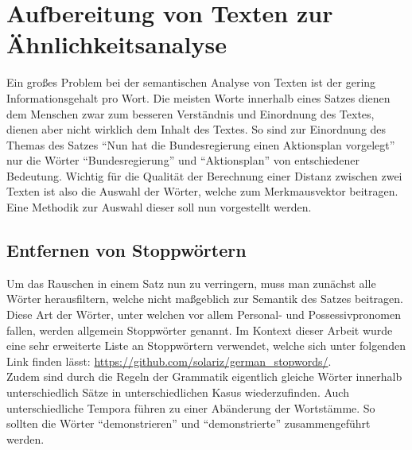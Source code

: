 \section{Aufbereitung von Texten zur Ähnlichkeitsanalyse}
\label{sec:aufbereitung_text}
Ein großes Problem bei der semantischen Analyse von Texten ist der gering Informationsgehalt pro Wort. Die meisten Worte innerhalb eines Satzes dienen dem Menschen zwar zum besseren Verständnis und Einordnung des Textes, dienen aber nicht wirklich dem Inhalt des Textes. So sind zur Einordnung des Themas des Satzes "`Nun hat die Bundesregierung einen Aktionsplan vorgelegt"' nur die Wörter "`Bundesregierung"' und "`Aktionsplan"' von entschiedener Bedeutung. Wichtig für die Qualität der Berechnung einer Distanz zwischen zwei Texten ist also die Auswahl der Wörter, welche zum Merkmausvektor beitragen. Eine Methodik zur Auswahl dieser soll nun vorgestellt werden.
\subsection{Entfernen von Stoppwörtern}
Um das Rauschen in einem Satz nun zu verringern, muss man zunächst alle Wörter herausfiltern, welche nicht maßgeblich zur Semantik des Satzes beitragen. Diese Art der Wörter, unter welchen vor allem Personal- und Possessivpronomen fallen, werden allgemein Stoppwörter genannt. Im Kontext dieser Arbeit wurde eine sehr erweiterte Liste an Stoppwörtern verwendet, welche sich unter folgenden Link finden lässt: \url{https://github.com/solariz/german_stopwords/}. \\ \newline
Zudem sind durch die Regeln der Grammatik eigentlich gleiche Wörter innerhalb unterschiedlich Sätze in unterschiedlichen Kasus wiederzufinden. Auch unterschiedliche Tempora führen zu einer Abänderung der Wortstämme. So sollten die Wörter "`demonstrieren"' und "`demonstrierte"' zusammengeführt werden.
